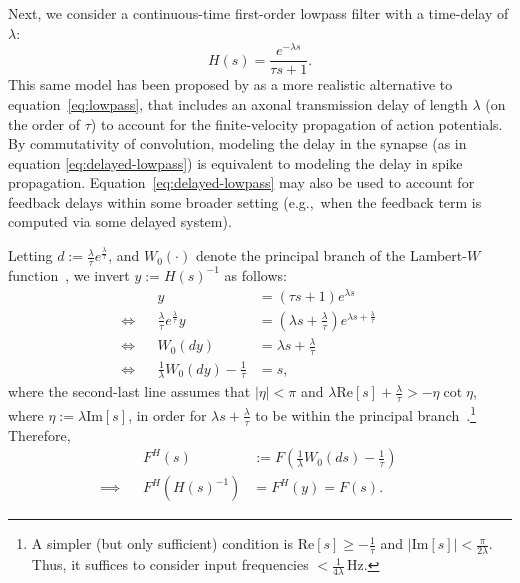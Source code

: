Next, we consider a continuous-time first-order lowpass filter with a time-delay of $\lambda$:
\begin{equation} \label{eq:delayed-lowpass}
H(s) = \frac{e^{-\lambda s}}{\tau s + 1} \text{.}
\end{equation}
This same model has been proposed by \citet[][equation~6.2]{roth2009modeling} as a more realistic alternative to equation~\ref{eq:lowpass}, that includes an axonal transmission delay of length $\lambda$ (on the order of $\tau$) to account for the finite-velocity propagation of action potentials.
By commutativity of convolution, modeling the delay in the synapse (as in equation \ref{eq:delayed-lowpass}) is equivalent to modeling the delay in spike propagation.
Equation~\ref{eq:delayed-lowpass} may also be used to account for feedback delays within some broader setting (e.g.,~when the feedback term is computed via some delayed system).

Letting $d := \frac{\lambda}{\tau}e^{\frac{\lambda}{\tau}}$, and $W_0(\cdot)$ denote the principal branch of the Lambert-$W$ function~\citep{corless1996lambertw}, we invert $y := H(s)^{-1}$ as follows:
\begin{align*}
&& y &= \left(\tau s + 1\right) e^{\lambda s} && \\
\iff && \frac{\lambda}{\tau}e^{\frac{\lambda}{\tau}} y &= \left( \lambda s + \frac{\lambda}{\tau} \right) e^{\lambda s + \frac{\lambda}{\tau}} && \\
\iff && W_0(dy) &= \lambda s + \frac{\lambda}{\tau} && \\
\iff && \frac{1}{\lambda} W_0(dy) - \frac{1}{\tau} &= s \text{,} &&
\end{align*}
where the second-last line assumes that $|\eta| < \pi$ and $\lambda \text{Re}\left[ s \right] + \frac{\lambda}{\tau} > - \eta \cot \eta$, where $\eta := \lambda \text{Im}\left[ s \right]$, in order for $\lambda s + \frac{\lambda}{\tau}$ to be within the principal branch~\citep[][equation~4.4]{corless1996lambertw}.\footnote{
A simpler (but only sufficient) condition is $\text{Re} \left[ s \right] \ge -\frac{1}{\tau}$ and $ | \text{Im} \left[ s \right] | < \frac{\pi}{2 \lambda}$.
Thus, it suffices to consider input frequencies $< \frac{1}{4\lambda}$\,Hz.}
Therefore,
\begin{align}
&& F^H(s) &:= F\left( \frac{1}{\lambda} W_0(ds) - \frac{1}{\tau} \right) \label{eq:delayed-lowpass-mapped} && \\
\implies && F^H(H(s)^{-1}) &= F^H(y) = F(s) \text{.} && \nonumber
\end{align}

